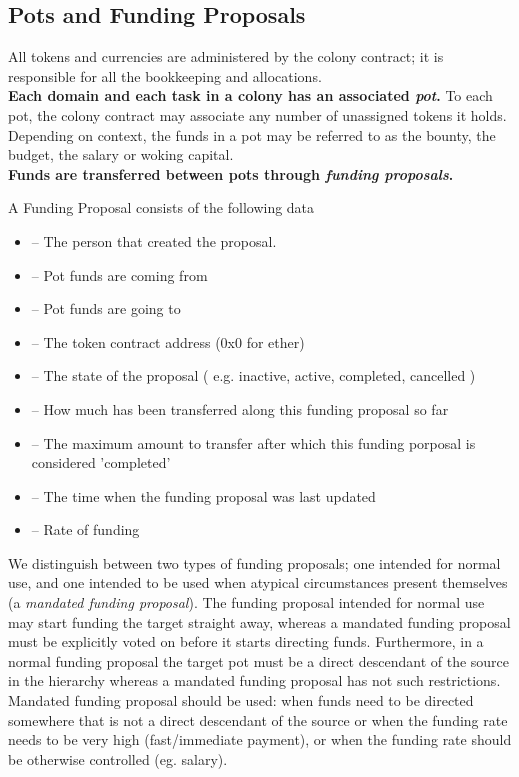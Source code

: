 \subsection{Pots and Funding Proposals}
All tokens and currencies are administered by the colony contract; it is responsible for all the bookkeeping and allocations.\\
\textbf{Each domain and each task in a colony has an associated \emph{pot}.} To each pot, the colony contract may associate any number of unassigned tokens it holds. Depending on context, the funds in a pot may be referred to as the bounty, the budget, the salary or woking capital.\\
\textbf{Funds are transferred between pots through \emph{funding proposals}.}
\begin{description}
 \item A Funding Proposal consists of the following data
 \begin{itemize}
  \item {}	--	The person that created the proposal.
  \item {}	--	Pot funds are coming from
  \item {}	--	Pot funds are going to
  \item {}	--	The token contract address (0x0 for ether)
  \item {}	--	The state of the proposal ( e.g. inactive, active, completed, cancelled )
  \item {}	--	How much has been transferred along this funding proposal so far
  \item {}	--	The maximum amount to transfer after which this funding porposal is considered 'completed'
  \item {}	--	The time when the funding proposal was last updated
  \item {}	--	Rate of funding
 \end{itemize}

\end{description}
We distinguish between two types of funding proposals; one intended for normal use, and one intended to be used when atypical circumstances present themselves (a \emph{mandated funding proposal}). The funding proposal intended for normal use may start funding the target straight away, whereas a mandated funding proposal must be explicitly voted on before it starts directing funds. Furthermore, in a normal funding proposal the target pot must be a direct descendant of the source in the hierarchy whereas a mandated funding proposal has not such restrictions.\\
Mandated funding proposal should be used: when funds need to be directed somewhere that is not a direct descendant of the source or when the funding rate needs to be very high (fast/immediate payment), or when the funding rate should be otherwise controlled (eg. salary).\\


